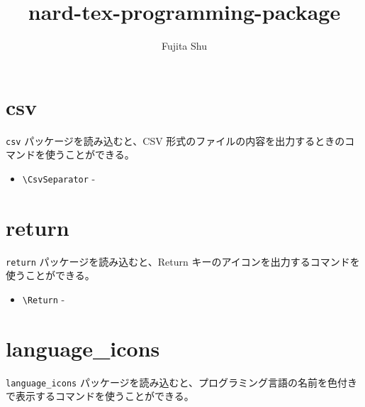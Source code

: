 \documentclass[oneside,10pt,a4paper]{jsarticle}
\title{nard-tex-programming-package}
\author{Fujita Shu}
\begin{document}
  \maketitle

  \section{csv}

  \verb|csv| パッケージを読み込むと、CSV 形式のファイルの内容を出力するときのコマンドを使うことができる。

  \begin{itemize}
    \item \verb|\CsvSeparator| - \CsvSeparator
  \end{itemize}

  \section{return}

  \verb|return| パッケージを読み込むと、Return キーのアイコンを出力するコマンドを使うことができる。

  \begin{itemize}
    \item \verb|\Return| - \Return
  \end{itemize}

  \section{language\_icons}

  \verb|language_icons| パッケージを読み込むと、プログラミング言語の名前を色付きで表示するコマンドを使うことができる。
\end{document}
